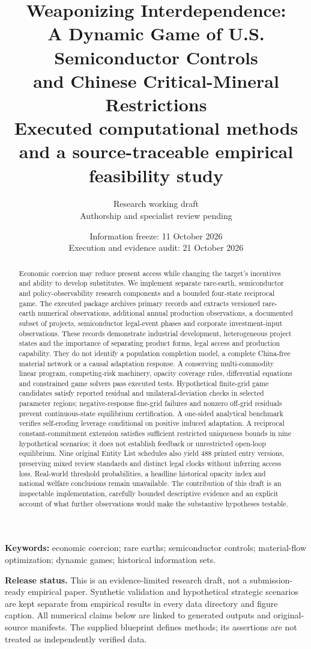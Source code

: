 \documentclass[11pt]{article}
\title{Weaponizing Interdependence:\\A Dynamic Game of U.S. Semiconductor Controls\\and Chinese Critical-Mineral Restrictions\\[0.6em]
\large Executed computational methods and a source-traceable empirical feasibility study}
\author{Research working draft\\Authorship and specialist review pending}
\date{Information freeze: 11 October 2026\\Execution and evidence audit: 21 October 2026}
\begin{document}
\maketitle
\begin{abstract}
Economic coercion may reduce present access while changing the target's incentives and ability to develop substitutes. We implement separate rare-earth, semiconductor and policy-observability research components and a bounded four-state reciprocal game. The executed package archives primary records and extracts \RareObs{} versioned rare-earth numerical observations, \LynasObs{} additional annual production observations, a documented subset of \ProjectCount{} projects, \LegalRows{} semiconductor legal-event phases and \FinancialRows{} corporate investment-input observations. These records demonstrate industrial development, heterogeneous project states and the importance of separating product forms, legal access and production capability. They do not identify a population completion model, a complete China-free material network or a causal adaptation response. A conserving multi-commodity linear program, competing-risk machinery, opacity coverage rules, differential equations and constrained game solvers pass \TestCount{} executed tests. Hypothetical finite-grid game candidates satisfy reported residual and unilateral-deviation checks in selected parameter regions; negative-response fine-grid failures and nonzero off-grid residuals prevent continuous-state equilibrium certification. A one-sided analytical benchmark verifies self-eroding leverage conditional on positive induced adaptation. A reciprocal constant-commitment extension satisfies sufficient restricted uniqueness bounds in nine hypothetical scenarios; it does not establish feedback or unrestricted open-loop equilibrium. Nine original Entity List schedules also yield 488 printed entry versions, preserving mixed review standards and distinct legal clocks without inferring access loss. Real-world threshold probabilities, a headline historical opacity index and national welfare conclusions remain unavailable. The contribution of this draft is an inspectable implementation, carefully bounded descriptive evidence and an explicit account of what further observations would make the substantive hypotheses testable.
\end{abstract}
\textbf{Keywords:} economic coercion; rare earths; semiconductor controls; material-flow optimization; dynamic games; historical information sets.

\textbf{Release status.} This is an evidence-limited research draft, not a submission-ready empirical paper. Synthetic validation and hypothetical strategic scenarios are kept separate from empirical results in every data directory and figure caption. All numerical claims below are linked to generated outputs and original-source manifests. The supplied blueprint defines methods; its assertions are not treated as independently verified data.
\tableofcontents
\newpage
\end{document}
